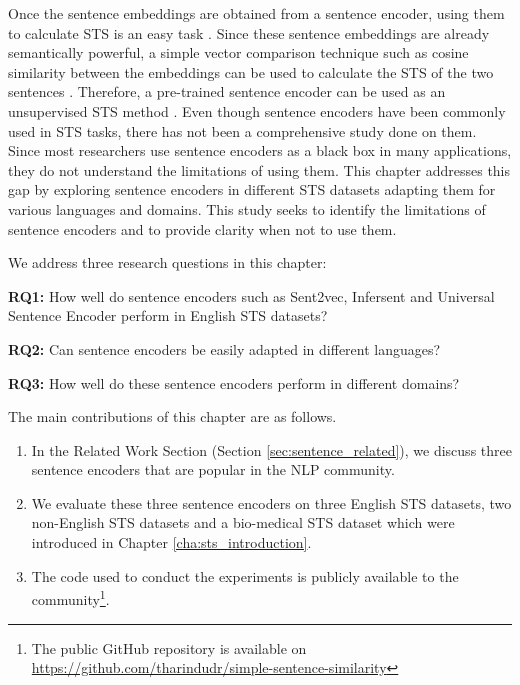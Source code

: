 Once the sentence embeddings are obtained from a sentence encoder, using them to calculate STS is an easy task \autocite{pagliardini-etal-2018-unsupervised}. Since these sentence embeddings are already semantically powerful, a simple vector comparison technique such as cosine similarity between the embeddings can be used to calculate the STS of the two sentences \autocite{conneau-kiela-2018-senteval}. Therefore, a pre-trained sentence encoder can be used as an unsupervised STS method \autocite{ranasinghe-etal-2019-enhancing}. Even though sentence encoders have been commonly used in STS tasks, there has not been a comprehensive study done on them. Since most researchers use sentence encoders as a black box in many applications, they do not understand the limitations of using them. This chapter addresses this gap by exploring sentence encoders in different STS datasets adapting them for various languages and domains. This study seeks to identify the limitations of sentence encoders and to provide clarity when not to use them. 

We address three research questions in this chapter:

\textbf{RQ1:} How well do sentence encoders such as Sent2vec, Infersent and Universal Sentence Encoder perform in English STS datasets?

\textbf{RQ2:} Can sentence encoders be easily adapted in different languages?

\textbf{RQ3:} How well do these sentence encoders perform in different domains?

The main contributions of this chapter are as follows.

\begin{enumerate}
	\item In the Related Work Section (Section \ref{sec:sentence_related}), we discuss three sentence encoders that are popular in the NLP community. 
	
	\item  We evaluate these three sentence encoders on three English STS datasets, two non-English STS datasets and a bio-medical STS dataset which were introduced in Chapter \ref{cha:sts_introduction}.
	
	\item The code used to conduct the experiments is publicly available to the community\footnote{The public GitHub repository is available on \url{https://github.com/tharindudr/simple-sentence-similarity}}.
	
\end{enumerate}

